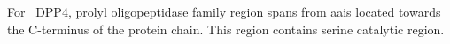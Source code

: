 For~ DPP4, prolyl oligopeptidase family region spans from aais located towards the C-terminus of the protein chain. This region contains serine catalytic region.  